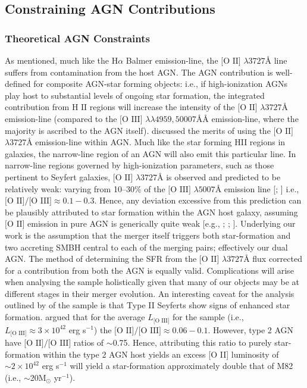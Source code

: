 \subsection{Constraining AGN Contributions}
\subsubsection{Theoretical AGN Constraints}

As mentioned, much like the $\text{H}\alpha$ Balmer emission-line, the $\text{[O II]}$  $\lambda{3727}Å$ line suffers from contamination from the host AGN. The AGN contribution is well-defined for composite AGN-star forming objects: i.e., if high-ionization AGNs play host to substantial levels of ongoing star formation, the integrated contribution from $\text{H II}$ regions will increase the intensity of the $\text{[O II]}$ $\lambda3727Å$  emission-line (compared to the $\text{[O III] }\lambda\lambda4959,50007ÅÅ$ emission-line, where the majority is ascribed to the AGN itself). \cite{2005ApJ...629..680H} discussed the merits of using the $\text{[O II]}$ $\lambda{3727}Å$ emission-line within AGN. Much like the star forming HII regions in galaxies, the narrow-line region of an AGN will also emit this particular line. In narrow-line regions governed by high-ionization parameters, such as those pertinent to Seyfert galaxies, $\text{[O II]}$ $\lambda{3727}Å$ is observed and predicted to be relatively weak: varying from 10--30\% of the $\text{[O III]}$ $\lambda{5007}Å$ emission line [\cite{Ferland_1986}; \cite{Ho_1993}] i.e., $\text{[O II]/[O III]}\approx{0.1-0.3}$. Hence, any deviation excessive from this prediction can be plausibly attributed to star formation within the AGN host galaxy, assuming $\text{[O II]}$ emission in pure AGN is generically quite weak [e.g., \cite{Ferland_1986}; \cite{Ho_1993}; \cite{2006ApJ...642..702K}]. Underlying our work is the assumption that the merger itself triggers both star-formation and two accreting SMBH central to each of the merging pairs; effectively our dual AGN. The method of determining the SFR from the $\text{[O II]}$ $\lambda{3727}Å$ flux corrected for a contribution from both the AGN is equally valid. Complications will arise when analysing the sample holistically given that many of our objects may be at different stages in their merger evolution. An interesting caveat for the analysis outlined by \cite{2006ApJ...642..702K} of the \cite{Zakamska2003} sample is that Type II Seyferts show signs of enhanced star formation. \cite{2006ApJ...642..702K} argued that for the average $L_{\text{[O III]}}$ for the \cite{Zakamska2003} sample (i.e., $L_{\text{[O III]}}\approx{3\times{10^{42}}}$ erg s$^{-1}$) the $\text{[O II]/[O III]}\approx{0.06-0.1}$. However, type 2 AGN have $\text{[O II]/[O III]}$ ratios of $\sim$0.75. Hence, attributing this ratio to purely star-formation within the type 2 AGN host yields an excess [O II] luminosity of $\sim{2\times{10^{42}}}$ erg s$^{-1}$ will yield a star-formation approximately double that of M82 (i.e., $\sim$20M$_{\odot}$ yr$^{-1}$).

